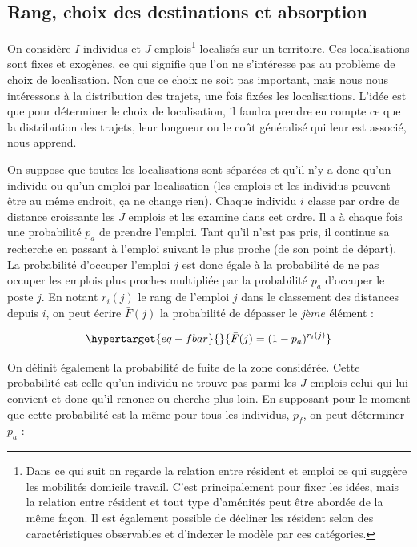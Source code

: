 \documentclass[
  10pt,
  a4paper,
  numbers=noendperiod,
  DIV=12]{scrartcl}
\begin{document}
\hypertarget{rang-choix-des-destinations-et-absorption}{%
\subsection{Rang, choix des destinations et
absorption}\label{rang-choix-des-destinations-et-absorption}}

On considère \(I\) individus et \(J\) emplois\footnote{Dans ce qui suit
  on regarde la relation entre résident et emploi ce qui suggère les
  mobilités domicile travail. C'est principalement pour fixer les idées,
  mais la relation entre résident et tout type d'aménités peut être
  abordée de la même façon. Il est également possible de décliner les
  résident selon des caractéristiques observables et d'indexer le modèle
  par ces catégories.} localisés sur un territoire. Ces localisations
sont fixes et exogènes, ce qui signifie que l'on ne s'intéresse pas au
problème de choix de localisation. Non que ce choix ne soit pas
important, mais nous nous intéressons à la distribution des trajets, une
fois fixées les localisations. L'idée est que pour déterminer le choix
de localisation, il faudra prendre en compte ce que la distribution des
trajets, leur longueur ou le coût généralisé qui leur est associé, nous
apprend.

On suppose que toutes les localisations sont séparées et qu'il n'y a
donc qu'un individu ou qu'un emploi par localisation (les emplois et les
individus peuvent être au même endroit, ça ne change rien). Chaque
individu \(i\) classe par ordre de distance croissante les \(J\) emplois
et les examine dans cet ordre. Il a à chaque fois une probabilité
\(p_a\) de prendre l'emploi. Tant qu'il n'est pas pris, il continue sa
recherche en passant à l'emploi suivant le plus proche (de son point de
départ). La probabilité d'occuper l'emploi \(j\) est donc égale à la
probabilité de ne pas occuper les emplois plus proches multipliée par la
probabilité \(p_a\) d'occuper le poste \(j\). En notant \(r_{i}(j)\) le
rang de l'emploi \(j\) dans le classement des distances depuis \(i\), on
peut écrire \(\bar F(j)\) la probabilité de dépasser le \(jème\) élément
:

\begin{equation}\protect\hypertarget{eq-fbar}{}{
\bar F(j)=(1-p_a)^{r_i(j)}
}\label{eq-fbar}\end{equation}

On définit également la probabilité de fuite de la zone considérée.
Cette probabilité est celle qu'un individu ne trouve pas parmi les \(J\)
emplois celui qui lui convient et donc qu'il renonce ou cherche plus
loin. En supposant pour le moment que cette probabilité est la même pour
tous les individus, \(p_f\), on peut déterminer \(p_a\) :
\end{document}

